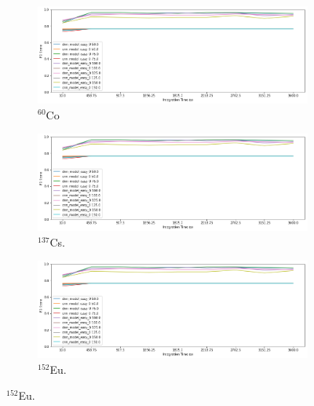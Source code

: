 \begin{figure}[H]
     \centering
     \begin{subfigure}[b]{0.9\textwidth}
         \centering
         \includegraphics[width=\textwidth]{images/results_easy_distance_comparison}
         \caption{$^{60}$Co}
         \label{fig:model_asymptotic_performance_co60}
     \end{subfigure}

     \begin{subfigure}[b]{0.9\textwidth}
         \centering
         \includegraphics[width=\textwidth]{images/results_easy_distance_comparison}
         \caption{$^{137}$Cs.}
         \label{fig:results_easy_distance_comparison_full}
     \end{subfigure}
     
     \begin{subfigure}[b]{0.9\textwidth}
         \centering
         \includegraphics[width=\textwidth]{images/results_easy_distance_comparison}
         \caption{$^{152}$Eu.}
         \label{fig:results_easy_distance_comparison_full}
     \end{subfigure}
     

\end{figure}
